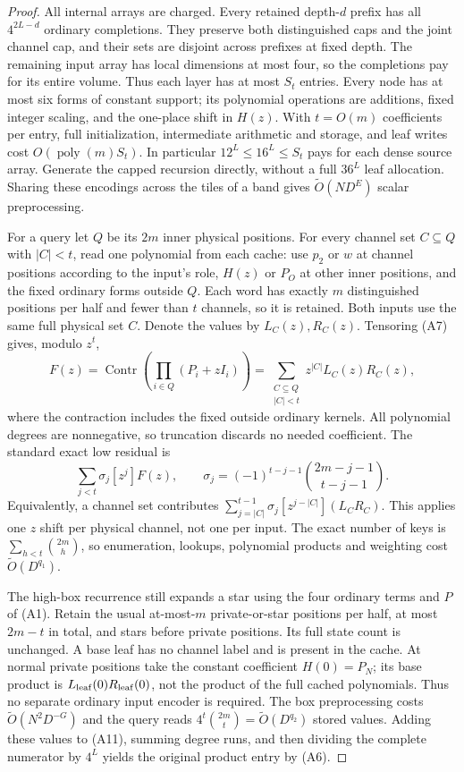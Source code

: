 \documentclass[11pt]{article}
\newcommand{\softO}{\widetilde O}
\begin{document}
\begin{proof}
All internal arrays are charged. Every retained depth-$d$ prefix
has all $4^{2L-d}$ ordinary completions. They preserve both
distinguished caps and the joint channel cap, and their sets are
disjoint across prefixes at fixed depth. The remaining input array
has local dimensions at most four, so the completions pay for its
entire volume. Thus each layer has at most $S_t$ entries. Every node
has at most six forms of constant support; its polynomial operations
are additions, fixed integer scaling, and the one-place shift in
$H(z)$. With $t=O(m)$ coefficients per entry, full initialization,
intermediate arithmetic and storage, and leaf writes cost
$O(\operatorname{poly}(m)S_t)$. In particular $12^L\le16^L\le S_t$
pays for each dense source array. Generate the capped recursion
directly, without a full $36^L$ leaf allocation. Sharing these
encodings across the tiles of a band gives $\softO(ND^E)$ scalar
preprocessing.

For a query let $Q$ be its $2m$ inner physical positions. For every
channel set $C\subseteq Q$ with $|C|<t$, read one polynomial from
each cache: use $p_2$ or $w$ at channel positions according to the
input's role, $H(z)$ or $P_O$ at other inner positions, and the fixed
ordinary forms outside $Q$. Each word has exactly $m$ distinguished
positions per half and fewer than $t$ channels, so it is retained.
Both inputs use the same full physical set $C$. Denote the values
by $L_C(z),R_C(z)$. Tensoring (A7) gives, modulo $z^t$,
\[
 F(z)=\operatorname{Contr}\!\left(\prod_{i\in Q}(P_i+zI_i)\right)
     =\sum_{\substack{C\subseteq Q\\|C|<t}}
                z^{|C|}L_C(z)R_C(z),                 \tag{A10}
\]
where the contraction includes the fixed outside ordinary kernels.
All polynomial degrees are nonnegative, so truncation discards no
needed coefficient. The standard exact low residual is
\[
 \sum_{j<t}\sigma_j[z^j]F(z),\qquad
 \sigma_j=(-1)^{t-j-1}\binom{2m-j-1}{t-j-1}.          \tag{A11}
\]
Equivalently, a channel set contributes
$\sum_{j=|C|}^{t-1}\sigma_j[z^{j-|C|}](L_CR_C)$.
This applies one $z$ shift per physical channel, not one per input.
The exact number of keys is $\sum_{h<t}\binom{2m}{h}$, so enumeration,
lookups, polynomial products and weighting cost $\softO(D^{q_1})$.

The high-box recurrence still expands a star using the four ordinary
terms and $P$ of (A1). Retain the usual at-most-$m$ private-or-star
positions per half, at most $2m-t$ in total, and stars before private
positions. Its full state count is unchanged. A base leaf has no
channel label and is present in the cache. At normal private positions
take the constant coefficient $H(0)=P_N$; its base product is
$L_{\rm leaf}(0)R_{\rm leaf}(0)$, not the product of the full cached
polynomials. Thus no separate ordinary input encoder is required.
The box preprocessing costs $\softO(N^2D^{-G})$ and the query reads
$4^t\binom{2m}{t}=\softO(D^{q_2})$ stored values. Adding these values
to (A11), summing degree runs, and then dividing the complete numerator
by $4^L$ yields the original product entry by (A6).


\end{proof}
\end{document}
